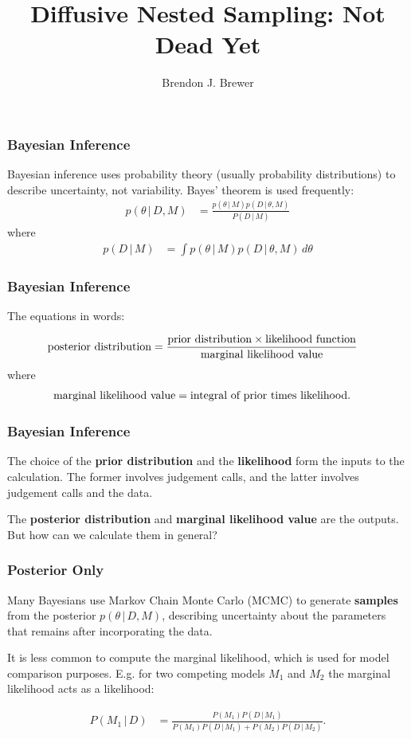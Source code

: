 \documentclass{beamer}
\author{Brendon J. Brewer}
\title{Diffusive Nested Sampling: Not Dead Yet}
\institute{Department of Statistics, The University of Auckland}
\date{}
\newcommand{\given}{\,|\,}
\begin{document}
\frame{\titlepage}

\begin{frame}
\frametitle{Bayesian Inference}
Bayesian inference uses probability theory (usually probability distributions)
to describe uncertainty, not variability. Bayes' theorem is used frequently:
\pause
\begin{align}
p(\theta \given D, M) &= \frac{p(\theta \given M)p(D \given \theta, M)}{P(D \given M)}
\end{align}
\pause
where
\begin{align}
p(D \given M) &= \int p(\theta \given M)p(D \given \theta, M) \, d\theta
\end{align}


\end{frame}



\begin{frame}
\frametitle{Bayesian Inference}
The equations in words:

\begin{align}
\textnormal{posterior distribution} &= 
    \frac{\textnormal{prior distribution} \times \textnormal{likelihood function}}{\textnormal{marginal likelihood value}}
\end{align}
\pause
where
\begin{align}
\textnormal{marginal likelihood value} &= \textnormal{integral of prior times likelihood}.
\end{align}


\end{frame}


\begin{frame}
\frametitle{Bayesian Inference}
The choice of the {\bf prior distribution} and the {\bf likelihood} form the
inputs to the calculation. The former involves judgement calls, and the latter
involves judgement calls and the data.\\[0.5em]\pause

The {\bf posterior distribution} and
{\bf marginal likelihood value} are the outputs. But how can we calculate them
in general?

\end{frame}


\begin{frame}
\frametitle{Posterior Only}
Many Bayesians use Markov Chain Monte Carlo (MCMC) to generate {\bf samples}
from the posterior $p(\theta \given D, M)$, describing uncertainty about the
parameters that remains after incorporating the data.\\[0.5em]\pause

It is less common to compute the marginal likelihood, which is used for
model comparison purposes. E.g. for two competing models $M_1$ and $M_2$
the marginal likelihood acts as a likelihood:

\begin{align}
P(M_1 \given D) &= \frac{P(M_1)P(D \given M_1)}
                        {P(M_1)P(D \given M_1) + P(M_2)P(D \given M_2)}.
\end{align}

\end{frame}
\end{document}
